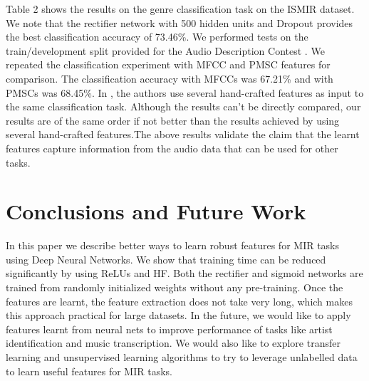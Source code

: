 \documentclass{article}
\begin{document}
Table 2 shows the results on the genre classification task on the ISMIR dataset. We note that the rectifier network with 500 hidden units and Dropout provides the best classification accuracy of 73.46\%. We performed tests on the train/development split provided for the Audio Description Contest \cite{ismir2004}. We repeated the classification experiment with MFCC and PMSC features for comparison. The classification accuracy with MFCCs was 67.21\% and with PMSCs was 68.45\%. In \cite{silla2010improving}, the authors use several hand-crafted features as input to the same classification task. Although the results can't be directly compared, our results are of the same order if not better than the results achieved by using several hand-crafted features.The above results validate the claim that the learnt features capture information from the audio data that can be used for other tasks. 

\section{Conclusions and Future Work}

In this paper we describe better ways to learn robust features for MIR tasks using Deep Neural Networks. We show that training time can be reduced significantly by using ReLUs and HF. Both the rectifier and sigmoid networks are trained from randomly initialized weights without any pre-training. Once the features are learnt, the feature extraction does not take very long, which makes this approach practical for large datasets. In the future, we would like to apply features learnt from neural nets to improve performance of tasks like artist identification and music transcription. We would also like to explore transfer learning and unsupervised learning algorithms to try to leverage unlabelled data to learn useful features for MIR tasks. 

%
%

\newpage
{}

\end{document}
